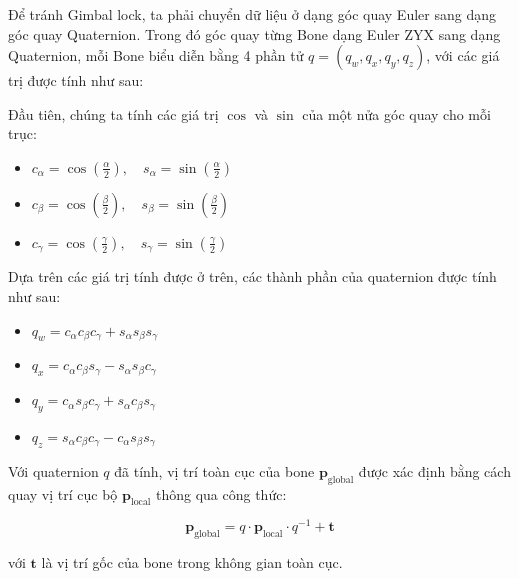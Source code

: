 Để tránh Gimbal lock, ta phải chuyển dữ liệu ở dạng góc quay Euler sang dạng góc quay Quaternion. Trong đó góc quay từng Bone dạng Euler ZYX sang dạng Quaternion, mỗi Bone biểu diễn bằng 4 phần tử $q = (q_w, q_x, q_y, q_z)$, với các giá trị được tính như sau:

Đầu tiên, chúng ta tính các giá trị $\cos$ và $\sin$ của một nửa góc quay cho mỗi trục:


\begin{itemize}
	\item $c_{\alpha} = \cos\left(\frac{\alpha}{2}\right), \quad s_{\alpha} = \sin\left(\frac{\alpha}{2}\right)$
	\item $c_{\beta} = \cos\left(\frac{\beta}{2}\right), \quad s_{\beta} = \sin\left(\frac{\beta}{2}\right)$
	\item $c_{\gamma} = \cos\left(\frac{\gamma}{2}\right), \quad s_{\gamma} = \sin\left(\frac{\gamma}{2}\right)$
\end{itemize}

Dựa trên các giá trị tính được ở trên, các thành phần của quaternion được tính như sau:


\begin{itemize}
	\item $q_w = c_{\alpha} c_{\beta} c_{\gamma} + s_{\alpha} s_{\beta} s_{\gamma}$
	\item $q_x = c_{\alpha} c_{\beta} s_{\gamma} - s_{\alpha} s_{\beta} c_{\gamma}$
	\item $q_y = c_{\alpha} s_{\beta} c_{\gamma} + s_{\alpha} c_{\beta} s_{\gamma}$
	\item $q_z = s_{\alpha} c_{\beta} c_{\gamma} - c_{\alpha} s_{\beta} s_{\gamma}$
\end{itemize}

Với quaternion $q$ đã tính, vị trí toàn cục của bone $\mathbf{p}_{\text{global}}$ được xác định bằng cách quay vị trí cục bộ $\mathbf{p}_{\text{local}}$ thông qua công thức:

\begin{equation}
	\mathbf{p}_{\text{global}} = q \cdot \mathbf{p}_{\text{local}} \cdot q^{-1} + \mathbf{t}
\end{equation}

với $\mathbf{t}$ là vị trí gốc của bone trong không gian toàn cục.



